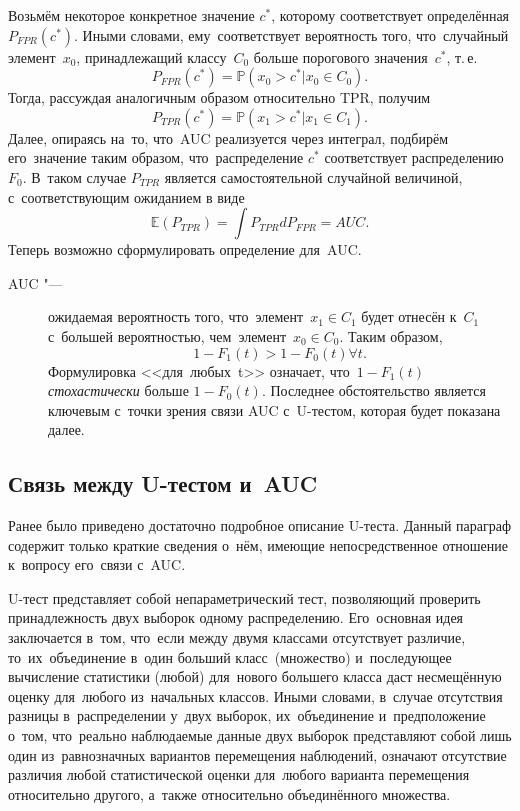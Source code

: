 \documentclass[]{scrreprt}
\begin{document}
Возьмём некоторое конкретное значение $c^{*}$, которому соответствует определённая $P_{FPR}(c^{*})$. Иными словами, ему~соответствует вероятность того, что~случайный элемент~$x_{0}$, принадлежащий классу~$C_{0}$ больше порогового значения~$c^{*}$, т.\,е.
\begin{equation}\label{eq:AUC-computation-3}
P_{FPR}(c^{*}) = \mathbb{P}(x_{0}>c^{*}|x_{0} \in C_{0}).
\end{equation}
Тогда, рассуждая аналогичным образом относительно TPR, получим
\begin{equation}\label{eq:AUC-computation-4}
P_{TPR}(c^{*}) = \mathbb{P}(x_{1}>c^{*}|x_{1} \in C_{1}).
\end{equation}
Далее, опираясь на~то, что~AUC реализуется через интеграл, подбирём его~значение  таким образом, что~распределение $c^{*}$ соответствует распределению $F_{0}$. В~таком случае $P_{TPR}$ является самостоятельной случайной величиной, с~соответствующим ожиданием в виде
\begin{equation}\label{eq:AUC-computation-integral}
\mathbb{E}(P_{TPR}) = \int P_{TPR} d P_{FPR} = AUC.
\end{equation}
Теперь возможно сформулировать определение для~AUC.
\begin{description}
	\item[AUC "---] ожидаемая вероятность того, что~элемент~$x_{1} \in C_{1}$ будет отнесён к~$C_{1}$ с~большей вероятностью, чем~элемент~$x_{0} \in C_{0}$. Таким образом,
	\begin{equation}\label{eq:AUC-definition}
	1-F_{1}(t)>1-F_{0}(t) \forall t.
	\end{equation}
	Формулировка <<для~любых~t>> означает, что~$1-F_{1}(t)$ \emph{стохастически} больше $1-F_{0}(t)$. Последнее обстоятельство является ключевым с~точки зрения связи AUC с~U-тестом, которая будет показана далее.
\end{description}
%
\subsection{Связь между U-тестом и~AUC}\label{U-test&AUC-relation}
Ранее было приведено достаточно подробное описание U-теста. Данный параграф содержит только краткие сведения о~нём, имеющие непосредственное отношение к~вопросу его~связи с~AUC.

U-тест представляет собой непараметрический тест, позволяющий проверить принадлежность двух выборок одному распределению. Его~основная идея заключается в~том, что~если между двумя классами отсутствует различие, то~их~объединение в~один больший класс~(множество) и~последующее вычисление статистики (любой) для~нового большего класса даст несмещённую оценку для~любого из~начальных классов. Иными словами, в~случае отсутствия разницы в~распределении у~двух выборок, их~объединение и~предположение о~том, что~реально наблюдаемые данные двух выборок представляют собой лишь один из~равнозначных вариантов перемещения наблюдений, означают отсутствие различия любой статистической оценки для~любого варианта перемещения относительно другого, а~также относительно объединённого множества.
\end{document}
